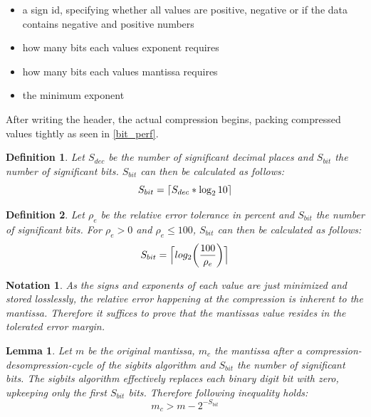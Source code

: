 \documentclass[
	12pt,
	a4paper,
	BCOR10mm,
	DIV14,
	headsepline,
]{scrreprt}
\newtheorem{lemma}{Lemma}
\newtheorem{definition}{Definition}
\newtheorem{notation}{Notation}
\DeclarePairedDelimiter{\ceil}{\lceil}{\rceil}
\begin{document}
\begin{itemize}
	\item a sign id, specifying whether all values are positive, negative or if the data
			contains negative and positive numbers
	\item how many bits each values exponent requires
	\item how many bits each values mantissa requires
	\item the minimum exponent
\end{itemize}

After writing the header, the actual compression begins, packing compressed
values tightly as seen in \cref{bit_perf}.

\clearpage

\begin{definition} \label{D:sigbits_sdec}
	Let $S_{dec}$ be the number of significant decimal places and $S_{bit}$
	the number of significant bits. $S_{bit}$ can then be calculated as follows:
	\[
		S_{bit}=\ceil{S_{dec} * \log_{2}{10}}
	\]
\end{definition}

\bigskip

\begin{definition} \label{D:sigbits_rtol}
	Let $\rho_{e}$ be the relative error tolerance in percent and $S_{bit}$
	the number of significant bits. For $\rho_{e} > 0$ and $\rho_{e} \le 100$,
	$S_{bit}$ can then be calculated as follows:
	\[
		S_{bit}=\ceil[\Big]{
			log_2{
				\left(
					\frac{100}{\rho_{e}}
				\right)
			}
		}
	\]
\end{definition}

\bigskip

\begin{notation} \label{N:sigbits}
	As the signs and exponents of each value are just minimized and stored
	losslessly, the relative error happening at the compression is inherent to the
	mantissa. Therefore it suffices to prove that the mantissas value resides in
	the tolerated error margin.
\end{notation}

\bigskip

\begin{lemma} \label{L:sigbits}
	Let $m$ be the original mantissa, $m_c$ the mantissa after a
	compression-desompression-cycle of the sigbits algorithm and $S_{bit}$ the
	number of significant bits. The sigbits algorithm effectively replaces each
	binary digit bit with zero, upkeeping only the first $S_{bit}$ bits.
	Therefore following inequality holds:
	\[
		m_c > m - 2^{-S_{bit}}
	\]
\end{lemma}
\end{document}
